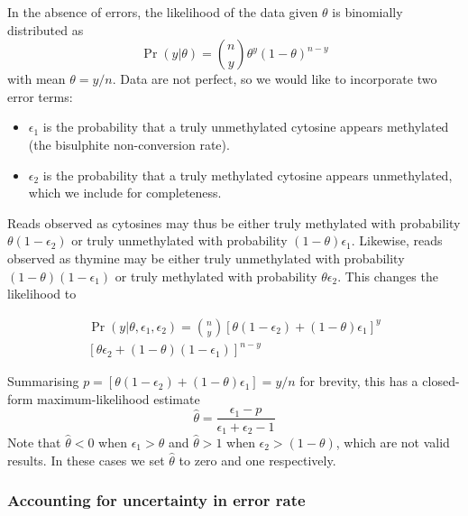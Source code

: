 \documentclass[twocolumn,twoside,lettersize]{article}
\begin{document}
In the absence of errors, the likelihood of the data given $\theta$ is binomially distributed as
\begin{equation}
    \label{eqn:classic-binomial}
    \Pr(y| \theta) = {n \choose y} \theta^y(1-\theta)^{n-y}
\end{equation}
with mean $\theta=y/n$.
Data are not perfect, so we would like to incorporate two error terms:
\begin{itemize}
    \item $\epsilon_1$ is the probability that a truly unmethylated cytosine appears methylated (the bisulphite non-conversion rate).
    \item $\epsilon_2$ is the probability that a truly methylated cytosine appears unmethylated, which we include for completeness.
\end{itemize}
Reads observed as cytosines may thus be either truly methylated with probability $\theta(1-\epsilon_2)$ or truly unmethylated with probability $(1-\theta)\epsilon_1$. Likewise, reads observed as thymine may be either truly unmethylated with probability $(1-\theta)(1-\epsilon_1)$ or truly methylated with probability $\theta \epsilon_2$.
This changes the likelihood to

\begin{equation}
\begin{split}
    \label{eqn:binom-with-errors}
    \Pr(y | \theta, \epsilon_1, \epsilon_2) = 
    {n \choose y}
    [\theta(1-\epsilon_2) + (1-\theta)\epsilon_1]^y \\
    [\theta \epsilon_2 + (1-\theta)(1-\epsilon_1)]^{n-y}
\end{split}
\end{equation}

Summarising $p=[\theta(1-\epsilon_2) + (1-\theta)\epsilon_1] = y/n$ for brevity, this has a closed-form maximum-likelihood estimate
\begin{equation}
    \label{eqn:ml-theta}
    \hat{\theta} = \frac{\epsilon_1-p}{\epsilon_1 + \epsilon_2 -1}
\end{equation}
Note that $\hat{\theta}<0$ when $\epsilon_1 > \theta$ and $\hat{\theta}>1$ when $\epsilon_2 > (1-\theta)$, which are not valid results.
In these cases we set $\hat{\theta}$ to zero and one respectively.

\subsubsection{Accounting for uncertainty in error rate} \label{sec:mean-as-beta}
\end{document}

